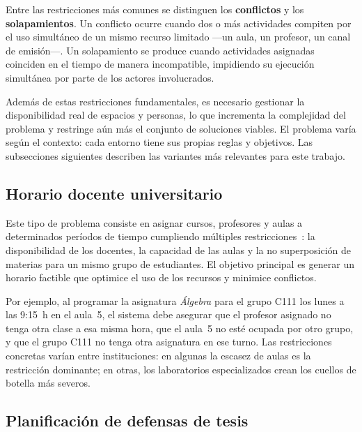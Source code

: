 Entre las restricciones más comunes se distinguen los \textbf{conflictos} y
los \textbf{solapamientos}.  Un conflicto ocurre cuando dos o más actividades
compiten por el uso simultáneo de un mismo recurso limitado ---un aula, un
profesor, un canal de emisión---.  Un solapamiento se produce cuando
actividades asignadas coinciden en el tiempo de manera incompatible,
impidiendo su ejecución simultánea por parte de los actores involucrados.

Además de estas restricciones fundamentales, es necesario gestionar la
disponibilidad real de espacios y personas, lo que incrementa la complejidad
del problema y restringe aún más el conjunto de soluciones viables.  El
problema varía según el contexto: cada entorno tiene sus propias reglas y
objetivos.  Las subsecciones siguientes describen las variantes más relevantes
para este trabajo.

\subsection{Horario docente universitario}
\label{ssec:horario-facultad}

Este tipo de problema consiste en asignar cursos, profesores y aulas a
determinados períodos de tiempo cumpliendo múltiples restricciones~\cite{abdennadher2000,muller2005,babaei2015}:
la disponibilidad de los docentes, la capacidad de las aulas y la no
superposición de materias para un mismo grupo de estudiantes.  El objetivo
principal es generar un horario factible que optimice el uso de los recursos
y minimice conflictos.

Por ejemplo, al programar la asignatura \textit{Álgebra} para el grupo C111
los lunes a las 9:15~h en el aula~5, el sistema debe asegurar que el profesor
asignado no tenga otra clase a esa misma hora, que el aula~5 no esté ocupada
por otro grupo, y que el grupo C111 no tenga otra asignatura en ese turno.
Las restricciones concretas varían entre instituciones: en algunas la escasez
de aulas es la restricción dominante; en otras, los laboratorios especializados
crean los cuellos de botella más severos.

\subsection{Planificaci\'on de defensas de tesis}
\label{ssec:horario-defensas}


